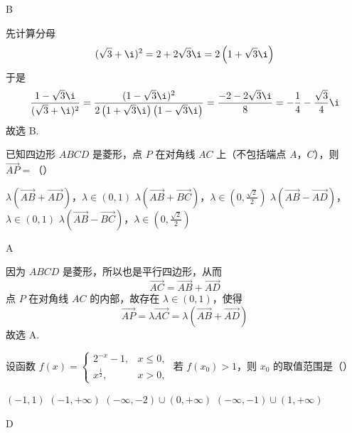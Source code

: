 \begin{answer}
B
\end{answer}

\begin{solution}
先计算分母
\[
(\sqrt{3}+\i)^2=2+2\sqrt{3}\i=2\left(1+\sqrt{3}\i\right)
\]
于是
\[
\frac{1-\sqrt{3}\i}{(\sqrt{3}+\i)^2}
=\frac{(1-\sqrt{3}\i)^2}{2\left(1+\sqrt{3}\i\right)\left(1-\sqrt{3}\i\right)}
=\frac{-2-2\sqrt{3}\i}{8}
=-\frac14-\frac{\sqrt{3}}4\i
\]
故选 B.
\end{solution}

\begin{problem}
已知四边形 \(ABCD\) 是菱形，点 \(P\) 在对角线 \(AC\) 上（不包括端点 \(A\)，\(C\)），则 \(\overrightarrow{AP} =\)（\quad）

\choices
    {\(\lambda (\overrightarrow{AB} + \overrightarrow{AD})\)，\(\lambda \in (0,1)\)}
    {\(\lambda (\overrightarrow{AB} + \overrightarrow{BC})\)，\(\lambda \in \left(0,\frac{\sqrt{2}}{2}\right)\)}
    {\(\lambda (\overrightarrow{AB} - \overrightarrow{AD})\)，\(\lambda \in (0,1)\)}
    {\(\lambda (\overrightarrow{AB} - \overrightarrow{BC})\)，\(\lambda \in \left(0,\frac{\sqrt{2}}{2}\right)\)}
\end{problem}

\begin{answer}
A
\end{answer}

\begin{solution}
因为 \(ABCD\) 是菱形，所以也是平行四边形，从而
\[
\overrightarrow{AC}=\overrightarrow{AB}+\overrightarrow{AD}
\]
点 \(P\) 在对角线 \(AC\) 的内部，故存在 \(\lambda\in(0,1)\)，使得
\[
\overrightarrow{AP}=\lambda\overrightarrow{AC}
=\lambda\left(\overrightarrow{AB}+\overrightarrow{AD}\right)
\]
故选 A.
\end{solution}

\begin{problem}
设函数 \( f(x) = \begin{cases}
2^{-x} - 1, & x \leqslant 0,\\
x^{\frac{1}{2}}, & x > 0,
\end{cases} \) 若 \( f(x_0) > 1 \)，则 \( x_0 \) 的取值范围是（\quad）

\choices
    {\((-1, 1)\)}
    {\((-1, +\infty)\)}
    {\((-\infty, -2) \cup (0, +\infty)\)}
    {\((-\infty, -1) \cup (1, +\infty)\)}
\end{problem}

\begin{answer}
D
\end{answer}

